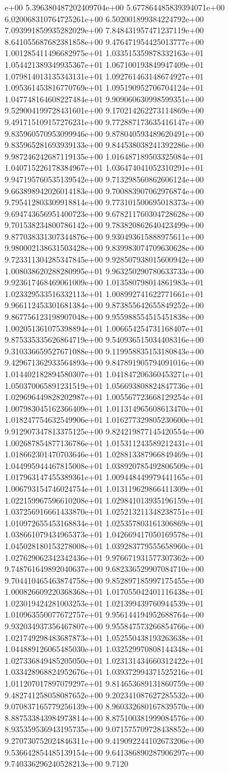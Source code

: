 e+00	5.396380487202409704e+00	5.677864485839394071e+00	6.020068310764725261e+00	6.502001899384224792e+00	7.093991859935282029e+00	7.848431957471237119e+00	8.641055687682381858e+00	9.476471954425013777e+00	1.001285411496682975e+01	1.033515359878332163e+01	1.054421389349935367e+01	1.067100193849947409e+01	1.079814013135343131e+01	1.092761463148674927e+01	1.095361453816770769e+01	1.095190952706704124e+01	1.047748164608227484e+01	9.909060630998599351e+00	9.529004199728431601e+00	9.170214262273114869e+00	9.491715109157276231e+00	9.772887173635416147e+00	9.835960570953099946e+00	9.878040593489620491e+00	9.835965281693939133e+00	9.844538038241392286e+00	9.987246242687119135e+00	1.016487189503325084e+01	1.040715226178384967e+01	1.036474041052310291e+01	9.947195760535139542e+00	9.713298560862606124e+00	9.663898942026014183e+00	9.700883907062976874e+00	9.795412803309918814e+00	9.773101500695018373e+00	9.694743656951400723e+00	9.678211760304728628e+00	9.701538234800786142e+00	9.783820862640423499e+00	9.877038331307344876e+00	9.930493615888975611e+00	9.980002138631503428e+00	9.839983074709630628e+00	9.723311304285347845e+00	9.928507938015600942e+00	1.008038620288280995e+01	9.963250290780633733e+00	9.923617468469061009e+00	1.013580798014861983e+01	1.023329533516332113e+01	1.008992741622771661e+01	9.966112453301681384e+00	9.873855642655849252e+00	9.867756123198907048e+00	9.955988554515451838e+00	1.002051361075398894e+01	1.006654254731168407e+01	9.875335335626864719e+00	9.540936515034408316e+00	9.310336659527671088e+00	9.119958835153180843e+00	9.429671362933564893e+00	9.847891905794091016e+00	1.014402182894580307e+01	1.041847206360453271e+01	1.050370065891231519e+01	1.056693808824847736e+01	1.029696449828202987e+01	1.005567723668129254e+01	1.007983045162366409e+01	1.011314965608613470e+01	1.018247754632549906e+01	1.016277329805230600e+01	9.912907347813375125e+00	9.824219877145420554e+00	1.002687854877136786e+01	1.015311243589212431e+01	1.018662301470703646e+01	1.028813387966849469e+01	1.044995944467815008e+01	1.038920785492806509e+01	1.017963147455389361e+01	1.009448449979441165e+01	1.006793154746024754e+01	1.013119629866411309e+01	1.022159967596610208e+01	1.029841013935196159e+01	1.037256916661433870e+01	1.025213211348238751e+01	1.010972655453168834e+01	1.025357803161306869e+01	1.038661079434965373e+01	1.042669417050169578e+01	1.045028180153278008e+01	1.039283779555658960e+01	1.027629062342342436e+01	9.976671931577307362e+00	9.748761649892040637e+00	9.682336529907084710e+00	9.704410465463874758e+00	9.852897185997175455e+00	1.000826609220368368e+01	1.017055042401116438e+01	1.023019424281003253e+01	1.021399439760944539e+01	1.010963550077672757e+01	9.956144194952688764e+00	9.932034937356467807e+00	9.955847573266854766e+00	1.021749298483687873e+01	1.052550438193263638e+01	1.044889126065485030e+01	1.032529970808144348e+01	1.027336849485205050e+01	1.023131434660312422e+01	1.033428968824952676e+01	1.039372994371525216e+01	1.011207017897079297e+01	9.814653689131860759e+00	9.482741258058087652e+00	9.202341087627285532e+00	9.070837165779256139e+00	8.960332680167839570e+00	8.887533843984973814e+00	8.875100381999084576e+00	8.935359536943195735e+00	9.071575709728438852e+00	9.270730752024846311e+00	9.419092244102673206e+00	9.536642854485139154e+00	9.641386890287906297e+00	9.740336296240528213e+00	9.7120